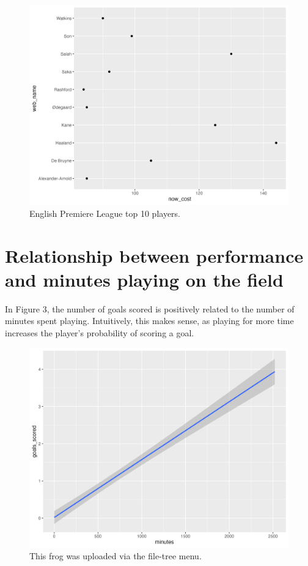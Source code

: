 \documentclass{article}
\begin{document}
\begin{figure}[H]
\centering
\includegraphics[width=0.75\linewidth]{PS6b_Akotenou.png}
\caption{\label{fig:frog}English Premiere League top 10 players.}
\end{figure}



\section{Relationship between performance and minutes playing on the field} 
In Figure 3, the number of goals scored is positively related to the number of minutes spent playing. Intuitively, this makes sense, as playing for more time increases the player's probability of scoring a goal.
\begin{figure}[H]
\centering
\includegraphics[width=0.75\linewidth]{PS6c_Akotenou.png}
\caption{\label{fig:frog}This frog was uploaded via the file-tree menu.}
\end{figure}
\end{document}
